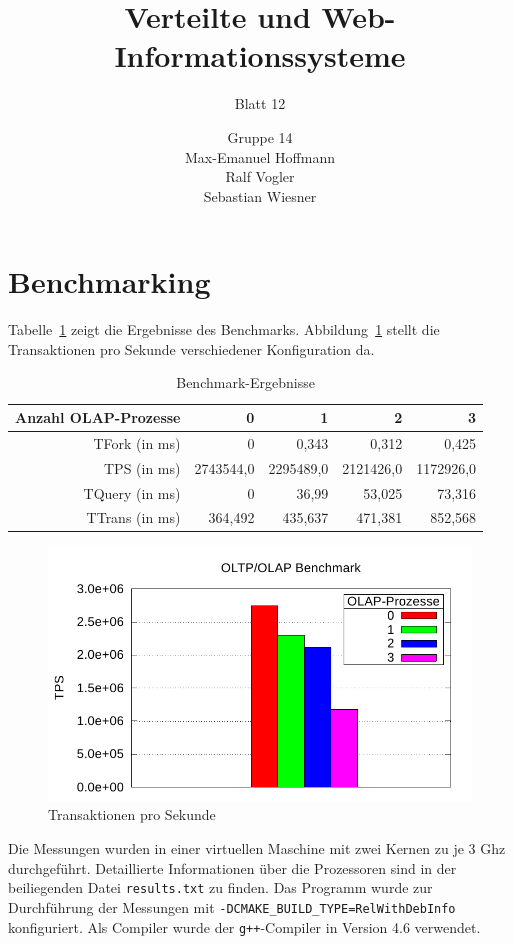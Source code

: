 \documentclass[11pt,a4paper]{scrartcl}
\begin{document}
\author{Gruppe 14\\Max-Emanuel Hoffmann\\Ralf Vogler\\Sebastian Wiesner}
\title{Verteilte und Web-Informationssysteme}
\subtitle{Blatt 12}

\maketitle

\setcounter{section}{1}

\section{Benchmarking}

Tabelle~\ref{tab:results} zeigt die Ergebnisse des Benchmarks.
Abbildung~\ref{fig:tps} stellt die Transaktionen pro Sekunde verschiedener
Konfiguration da.

\begin{table}[h]
  \centering
  \begin{tabular}{r|r|r|r|r}
    \textbf{Anzahl OLAP-Prozesse} & \textbf{0} & \textbf{1} & \textbf{2} &
    \textbf{3} \\
    \hline
    TFork (in ms) & 0 & 0,343 & 0,312 & 0,425 \\
    TPS (in ms) & 2743544,0 & 2295489,0 & 2121426,0 & 1172926,0 \\
    TQuery (in ms) & 0 & 36,99 & 53,025 & 73,316 \\
    TTrans (in ms) & 364,492 & 435,637 & 471,381 & 852,568 \\
  \end{tabular}
  \caption{Benchmark-Ergebnisse}
  \label{tab:results}
\end{table}

\begin{figure}[h]
  \centering
  \includegraphics[scale=.75]{TPS.pdf}
  \caption{Transaktionen pro Sekunde}
  \label{fig:tps}
\end{figure}

Die Messungen wurden in einer virtuellen Maschine mit zwei Kernen zu je 3 Ghz
durchgeführt.  Detaillierte Informationen über die Prozessoren sind in der
beiliegenden Datei \texttt{results.txt} zu finden.  Das Programm wurde zur
Durchführung der Messungen mit \texttt{-DCMAKE\_BUILD\_TYPE=RelWithDebInfo}
konfiguriert.  Als Compiler wurde der \texttt{g++}-Compiler in Version 4.6
verwendet.
\end{document}
